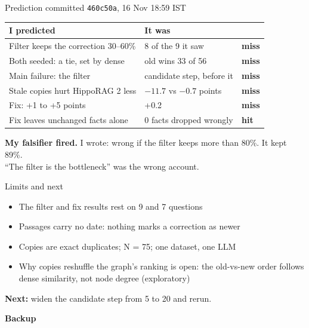 \documentclass[aspectratio=169,12pt]{beamer}
\newcommand{\quiet}[1]{{\color{muted}\small #1}}
\newcommand{\hit}{{\color{accent}\bfseries hit}}
\newcommand{\miss}{{\bfseries miss}}
\begin{document}
\begin{frame}{Prediction committed \texttt{460c50a}, 16 Nov 18:59 IST}
\small
\begin{tabular}{@{}p{}p{}l@{}}
\toprule
I predicted & It was & \\
\midrule
Filter keeps the correction 30--60\% & 8 of the 9 it saw & \miss\\
Both seeded: a tie, set by dense & old wins 33 of 56 & \miss\\
Main failure: the filter & candidate step, before it & \miss\\
Stale copies hurt HippoRAG 2 less & $-11.7$ vs $-0.7$ points & \miss\\
Fix: +1 to +5 points & +0.2 & \miss\\
Fix leaves unchanged facts alone & 0 facts dropped wrongly & \hit\\
\bottomrule
\end{tabular}

\vspace{0.8em}
\normalsize
{\color{accent}\bfseries My falsifier fired.} I wrote: wrong if the filter keeps more than 80\%. It kept 89\%.\\
\quiet{``The filter is the bottleneck'' was the wrong account.}
\end{frame}

\begin{frame}{Limits and next}
\begin{itemize}
\item The filter and fix results rest on 9 and 7 questions
\item Passages carry no date: nothing marks a correction as newer
\item Copies are exact duplicates; N = 75; one dataset, one LLM
\item Why copies reshuffle the graph's ranking is open: the old-vs-new order follows dense similarity, not node degree \quiet{(exploratory)}
\end{itemize}
\vspace{0.6em}
\textbf{Next:} widen the candidate step from 5 to 20 and rerun.
\end{frame}

\appendix
\begin{frame}
\centering\vspace{5.5em}
{\Large\bfseries Backup}
\end{frame}
\end{document}
